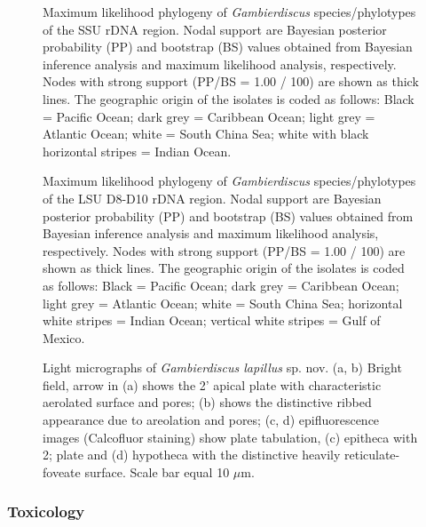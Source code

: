 \documentclass[12pt]{article}
\begin{document}
\begin{figure} 
\caption{Maximum likelihood phylogeny of \textit{Gambierdiscus} species/phylotypes of the SSU rDNA region. Nodal support are Bayesian posterior probability (PP) and bootstrap (BS) values obtained from Bayesian inference analysis and maximum likelihood analysis, respectively. Nodes with strong support (PP/BS = 1.00 / 100) are shown as thick lines. The geographic origin of the isolates is coded as follows: Black = Pacific Ocean; dark grey = Caribbean Ocean; light grey = Atlantic Ocean; white = South China Sea; white with black horizontal stripes = Indian Ocean.}
\label{fig:HGSSU} 
\end{figure} 
 
\FloatBarrier
\begin{figure} 
\caption{Maximum likelihood phylogeny of \textit{Gambierdiscus} species/phylotypes of the LSU D8-D10 rDNA region. Nodal support are Bayesian posterior probability (PP) and bootstrap (BS) values obtained from Bayesian inference analysis and maximum likelihood analysis, respectively. Nodes with strong support (PP/BS = 1.00 / 100) are shown as thick lines. The geographic origin of the isolates is coded as follows: Black = Pacific Ocean; dark grey = Caribbean Ocean; light grey = Atlantic Ocean; white = South China Sea; horizontal white stripes = Indian Ocean; vertical white stripes = Gulf of Mexico.} 
\label{fig:HGD8D10}
\end{figure} 
\FloatBarrier

\begin{figure} 
\caption{Light micrographs of \textit{Gambierdiscus lapillus} sp. nov. (a, b) Bright field, arrow in (a) shows the 2' apical plate with characteristic aerolated surface and pores; (b) shows the distinctive ribbed appearance due to areolation and pores; (c, d) epifluorescence images (Calcofluor staining) show plate tabulation, (c) epitheca with 2; plate and (d) hypotheca with the distinctive heavily reticulate-foveate surface. Scale bar equal 10 $\mu$m.​} 
\label{fig:PetLM}
\end{figure} 
\FloatBarrier 
\subsubsection{Toxicology}
\end{document}
